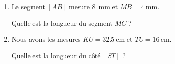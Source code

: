 
\begin{exercice}\label{exo2smath-0314}


    \begin{multicols}{2}
        \begin{enumerate}
            \item
                Le segment \( [AB]\) mesure \SI{8}{\milli\meter} et \( MB=\SI{4}{\milli\meter}\). 

\begin{center}
   
\end{center}

Quelle est la longueur du segment \( MC\) ?
\columnbreak

\item
    Nous avons les mesures \( KU=\SI{32.5}{\centi\meter}\) et \( TU=\SI{16}{\centi\meter}\).
\begin{center}
   
\end{center}
Quelle est la longueur du côté \( [ST]\) ?


        \end{enumerate}
    \end{multicols}
    

\end{exercice}
